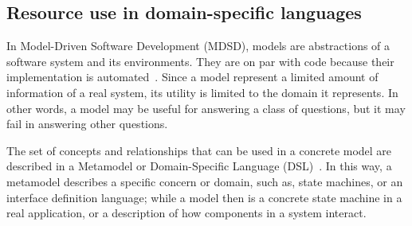 %
%
%
%
%
%
%


\subsection{Resource use in domain-specific languages} \label{sec:DSL-on-MRTEs}

In Model-Driven Software Development (MDSD), models are abstractions of a software system and its environments.
They are on par with code because their implementation is automated~\cite{Stahl:2006:MSD:1196766, Fowler:2010:DSL:1809745}.
Since a model represent a limited amount of information of a real system, its utility is limited to the domain it represents.
In other words, a model may be useful for answering a class of questions, but it may fail in answering other questions.

The set of concepts and relationships that can be used in a concrete model are described in a Metamodel or Domain-Specific Language (DSL)~\cite{Fowler:2010:DSL:1809745}.
In this way, a metamodel describes a specific concern or domain, such as, state machines, or an interface definition language; while a model then is a concrete state machine in a real application, or a description of how components in a system interact.
 
